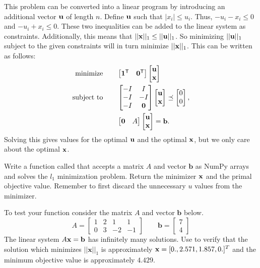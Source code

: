 This problem can be converted into a linear program by introducing an additional vector $\mathbf{u}$ of length $n$.
Define $\mathbf{u}$ such that $|x_i|\leq u_i$. 
Thus, $-u_i-x_i\leq 0$ and $-u_i+x_i\leq 0$.
These two inequalities can be added to the linear system as constraints.
Additionally, this means that $||\mathbf{x}||_1\leq ||\mathbf{u}||_1$.
So minimizing $||\mathbf{u}||_1$ subject to the given constraints will in turn minimize $||\mathbf{x}||_1$.
This can be written as follows:
\begin{align*}
\text{minimize}\qquad
&\begin{bmatrix}
\mathbf{1}^{\mathsf T} & \mathbf{0}^{\mathsf T}
\end{bmatrix}
\begin{bmatrix}
\mathbf{u} \\
\mathbf{x}
\end{bmatrix}\\
\text{subject to}\qquad
&\begin{bmatrix}
-I & I\\
-I & -I\\
-I & \mathbf{0}
\end{bmatrix}
\begin{bmatrix}
\mathbf{u} \\
\mathbf{x}
\end{bmatrix}
\preceq
\begin{bmatrix}
0\\
0
\end{bmatrix},\\
&\begin{bmatrix}
\mathbf{0} & A
\end{bmatrix}
\begin{bmatrix}
\mathbf{u} \\
\mathbf{x}
\end{bmatrix}
=
\mathbf{b}.
\end{align*}
Solving this gives values for the optimal $\mathbf{u}$ and the optimal $\mathbf{x}$, but we only care about the optimal $\mathbf{x}$.

\begin{problem}
Write a function called  that accepts a matrix $A$ and vector $\mathbf{b}$ as NumPy arrays and solves the $l_1$ minimization problem.
Return the minimizer $\mathbf{x}$ and the primal objective value.
Remember to first discard the unnecessary $u$ values from the minimizer.

To test your function consider the matrix $A$ and vector $\mathbf{b}$ below.
\[
A = \begin{bmatrix}
1 & 2 & 1 & 1\\
0 & 3 & -2 & -1
\end{bmatrix} \qquad
\mathbf{b} = \begin{bmatrix}
7 \\
4
\end{bmatrix}
\]
The linear system $A\mathbf{x} = \mathbf{b}$ has infinitely many solutions.
Use  to verify that the solution which minimizes $||\mathbf{x}||_1$ is approximately $\mathbf{x} = [0., 2.571, 1.857, 0.]^T$ and the minimum objective value is approximately $4.429$.
\label{prob:l1}
\end{problem}

